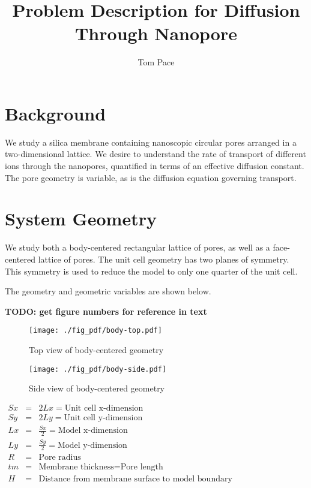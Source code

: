 \documentclass{article}
\begin{document}
\title{Problem Description for Diffusion Through Nanopore}
\author{Tom Pace}
\maketitle

\section{Background}

We study a silica membrane containing nanoscopic circular pores arranged in a two-dimensional lattice.
We desire to understand the rate of transport of different ions through the nanopores,
quantified in terms of an effective diffusion constant.
The pore geometry is variable, as is the diffusion equation governing transport.

\section{System Geometry}

We study both a body-centered rectangular lattice of pores,
as well as a face-centered lattice of pores.
The unit cell geometry has two planes of symmetry.
This symmetry is used to reduce the model to only one quarter of the unit cell.

The geometry and geometric variables are shown below.

\textbf{TODO: get figure numbers for reference in text}

\begin{figure}[htbp]
\centering
\texttt{[image: ./fig\_pdf/body-top.pdf]}
\caption{Top view of body-centered geometry}
\end{figure}

\begin{figure}[htbp]
\centering
\texttt{[image: ./fig\_pdf/body-side.pdf]}
\caption{Side view of body-centered geometry}
\end{figure}

$\begin{array}{rcl}
Sx & = & 2 Lx =\text{Unit cell x-dimension} \\
Sy & = & 2 Ly =\text{Unit cell y-dimension} \\
Lx & = & \frac{Sx}{2} =\text{Model x-dimension} \\
Ly & = & \frac{Sy}{2} =\text{Model y-dimension} \\
R & = & \text{Pore radius} \\
tm & = & \text{Membrane thickness} = \text{Pore length} \\
H & = & \text{Distance from membrane surface to model boundary}
\end{array}$
\end{document}
